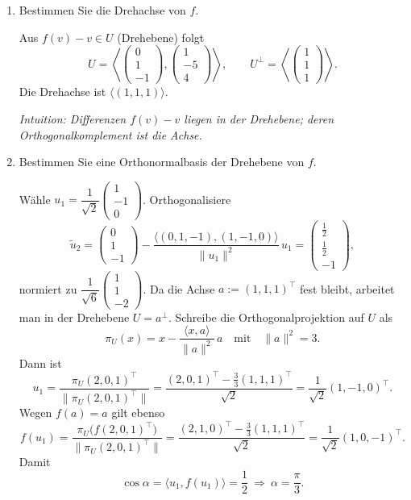 \documentclass[11pt, a4paper]{article}
\begin{document}
\begin{enumerate}
  \item Bestimmen Sie die Drehachse von $f$.
  \begin{framed}
  Aus $f(v)-v\in U$ (Drehebene) folgt
  \[
  U=\left\langle\begin{pmatrix}0\\1\\-1\end{pmatrix},
  \begin{pmatrix}1\\-5\\4\end{pmatrix}\right\rangle,\qquad
  U^\perp=\left\langle\begin{pmatrix}1\\1\\1\end{pmatrix}\right\rangle.
  \]
  Die Drehachse ist $\langle(1,1,1)\rangle$.

  \medskip\noindent\textit{Intuition: Differenzen $f(v)-v$ liegen in der Drehebene; deren Orthogonalkomplement ist die Achse.}
  \end{framed}

  \item Bestimmen Sie eine Orthonormalbasis der Drehebene von $f$.
  \begin{framed}
  Wähle $u_1=\dfrac{1}{\sqrt2}\begin{pmatrix}1\\-1\\0\end{pmatrix}$.
  Orthogonalisiere
  \[
  \tilde u_2=\begin{pmatrix}0\\1\\-1\end{pmatrix}
  -\frac{\langle(0,1,-1),(1,-1,0)\rangle}{\|u_1\|^2}\,u_1
  =\begin{pmatrix}\tfrac12\\\tfrac12\\-1\end{pmatrix},
  \]
  normiert zu $\dfrac{1}{\sqrt6}\begin{pmatrix}1\\1\\-2\end{pmatrix}$.
  Da die Achse $a:=(1,1,1)^{\top}$ fest bleibt, arbeitet man in der Drehebene
$U=a^{\perp}$. Schreibe die Orthogonalprojektion auf $U$ als
\[
\pi_U(x)=x-\frac{\langle x,a\rangle}{\|a\|^2}\,a
\quad\text{mit}\quad \|a\|^2=3.
\]
Dann ist
\[
u_1=\frac{\pi_U(2,0,1)^{\top}}{\|\pi_U(2,0,1)^{\top}\|}
=\frac{(2,0,1)^{\top}-\frac{3}{3}(1,1,1)^{\top}}{\sqrt2}
=\frac{1}{\sqrt2}(1,-1,0)^{\top}.
\]
Wegen $f(a)=a$ gilt ebenso
\[
f(u_1)=\frac{\pi_U\bigl(f(2,0,1)^{\top}\bigr)}{\|\pi_U(2,0,1)^{\top}\|}
=\frac{(2,1,0)^{\top}-\frac{3}{3}(1,1,1)^{\top}}{\sqrt2}
=\frac{1}{\sqrt2}(1,0,-1)^{\top}.
\]
Damit
\[
\cos\alpha=\langle u_1,f(u_1)\rangle=\frac12
\ \Rightarrow\ \alpha=\frac{\pi}{3}.
\]



\end{framed}
\end{enumerate}
\end{document}
